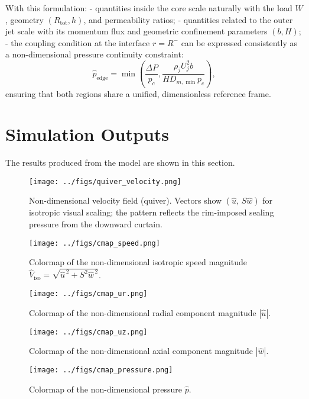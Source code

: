 \documentclass[11pt,a4paper]{article}
\begin{document}
With this formulation:
- quantities inside the core scale naturally with the load \(W\), geometry \((R_{\mathrm{tot}},h)\), and permeability ratios;
- quantities related to the outer jet scale with its momentum flux and geometric confinement parameters \((b,H)\);
- the coupling condition at the interface \(r = R^{-}\) can be expressed consistently as a non-dimensional pressure continuity constraint:
  \[
  \hat{p}_{\mathrm{edge}} = 
  \min\left( 
      \frac{\Delta P}{p_c}, 
      \frac{\rho_j U_j^2 b}{H D_{m,\min} p_c}
  \right),
  \]
  ensuring that both regions share a unified, dimensionless reference frame.



\section{Simulation Outputs}
\label{sec:simulation-outputs}

The results produced from the model are shown in this section.

\begin{figure}[H]
  \centering
  \texttt{[image: ../figs/quiver\_velocity.png]}
  \caption{Non-dimensional velocity field (quiver).
Vectors show $(\hat u,\,S\hat w)$ for isotropic visual scaling; the pattern reflects the rim-imposed sealing pressure from the downward curtain.}
  \label{fig:quiver}
\end{figure}
\begin{figure}[H]
  \centering
  \texttt{[image: ../figs/cmap\_speed.png]}
  \caption{Colormap of the non-dimensional isotropic speed magnitude $\hat V_{\mathrm{iso}}=\sqrt{\hat u^{\,2}+S^{2}\hat w^{\,2}}$.}
  \label{fig:cmap_speed}
\end{figure}
\begin{figure}[H]
  \centering
  \texttt{[image: ../figs/cmap\_ur.png]}
  \caption{Colormap of the non-dimensional radial component magnitude $|\hat u|$.}
  \label{fig:cmap_ur}
\end{figure}
\begin{figure}[H]
  \centering
  \texttt{[image: ../figs/cmap\_uz.png]}
  \caption{Colormap of the non-dimensional axial component magnitude $|\hat w|$.}
  \label{fig:cmap_uz}
\end{figure}
\begin{figure}[H]
  \centering
  \texttt{[image: ../figs/cmap\_pressure.png]}
  \caption{Colormap of the non-dimensional pressure $\hat p$.}
  \label{fig:cmap_p}
\end{figure}
\end{document}
